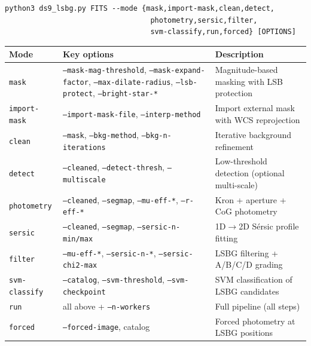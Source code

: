 \documentclass[11pt,fleqn]{book}
\begin{document}
\begin{codebox}[Synopsis]
\begin{lstlisting}[style=bash,numbers=none]
python3 ds9_lsbg.py FITS --mode {mask,import-mask,clean,detect,
                                  photometry,sersic,filter,
                                  svm-classify,run,forced} [OPTIONS]
\end{lstlisting}
\end{codebox}

\begin{center}
\begin{longtable}{L{2.2cm} L{3.8cm} L{6.5cm}}
\toprule
\textbf{Mode} & \textbf{Key options} & \textbf{Description} \\
\midrule
\endhead
\texttt{mask} & \texttt{--mask-mag-threshold}, \texttt{--mask-expand-factor}, \texttt{--max-dilate-radius}, \texttt{--lsb-protect}, \texttt{--bright-star-*} & Magnitude-based masking with LSB protection \\
\midrule
\texttt{import-mask} & \texttt{--import-mask-file}, \texttt{--interp-method} & Import external mask with WCS reprojection \\
\midrule
\texttt{clean} & \texttt{--mask}, \texttt{--bkg-method}, \texttt{--bkg-n-iterations} & Iterative background refinement \\
\midrule
\texttt{detect} & \texttt{--cleaned}, \texttt{--detect-thresh}, \texttt{--multiscale} & Low-threshold detection (optional multi-scale) \\
\midrule
\texttt{photometry} & \texttt{--cleaned}, \texttt{--segmap}, \texttt{--mu-eff-*}, \texttt{--r-eff-*} & Kron + aperture + CoG photometry \\
\midrule
\texttt{sersic} & \texttt{--cleaned}, \texttt{--segmap}, \texttt{--sersic-n-min/max} & 1D$\to$2D S\'ersic profile fitting \\
\midrule
\texttt{filter} & \texttt{--mu-eff-*}, \texttt{--sersic-n-*}, \texttt{--sersic-chi2-max} & LSBG filtering + A/B/C/D grading \\
\midrule
\texttt{svm-classify} & \texttt{--catalog}, \texttt{--svm-threshold}, \texttt{--svm-checkpoint} & SVM classification of LSBG candidates \\
\midrule
\texttt{run} & all above + \texttt{--n-workers} & Full pipeline (all steps) \\
\midrule
\texttt{forced} & \texttt{--forced-image}, catalog & Forced photometry at LSBG positions \\
\bottomrule
\end{longtable}
\end{center}
\end{document}
